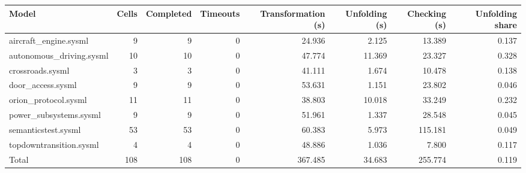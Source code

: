 \begin{tabular}{lrrrrrrr}
\toprule
Model & Cells & Completed & Timeouts & Transformation (s) & Unfolding (s) & Checking (s) & Unfolding share \\
\midrule
aircraft\_engine.sysml & 9 & 9 & 0 & 24.936 & 2.125 & 13.389 & 0.137 \\
autonomous\_driving.sysml & 10 & 10 & 0 & 47.774 & 11.369 & 23.327 & 0.328 \\
crossroads.sysml & 3 & 3 & 0 & 41.111 & 1.674 & 10.478 & 0.138 \\
door\_access.sysml & 9 & 9 & 0 & 53.631 & 1.151 & 23.802 & 0.046 \\
orion\_protocol.sysml & 11 & 11 & 0 & 38.803 & 10.018 & 33.249 & 0.232 \\
power\_subsystems.sysml & 9 & 9 & 0 & 51.961 & 1.337 & 28.548 & 0.045 \\
semanticstest.sysml & 53 & 53 & 0 & 60.383 & 5.973 & 115.181 & 0.049 \\
topdowntransition.sysml & 4 & 4 & 0 & 48.886 & 1.036 & 7.800 & 0.117 \\
\midrule
Total & 108 & 108 & 0 & 367.485 & 34.683 & 255.774 & 0.119 \\
\bottomrule
\end{tabular}
